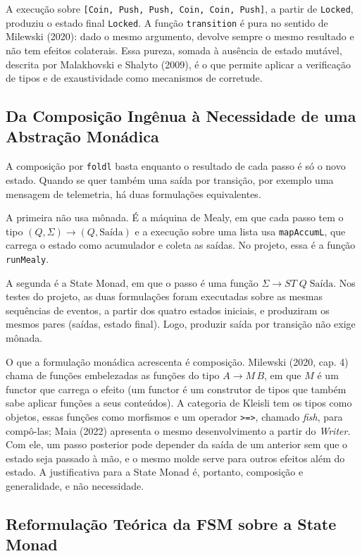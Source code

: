 \documentclass[12pt,a4paper]{article}
\begin{document}
A execução sobre \texttt{[Coin, Push, Push, Coin, Coin, Push]}, a partir de \texttt{Locked}, produziu o estado final \texttt{Locked}. A função \texttt{transition} é pura no sentido de Milewski (2020): dado o mesmo argumento, devolve sempre o mesmo resultado e não tem efeitos colaterais. Essa pureza, somada à ausência de estado mutável, descrita por Malakhovski e Shalyto (2009), é o que permite aplicar a verificação de tipos e de exaustividade como mecanismos de corretude.

\subsection{Da Composição Ingênua à Necessidade de uma Abstração Monádica}

A composição por \texttt{foldl} basta enquanto o resultado de cada passo é só o novo estado. Quando se quer também uma saída por transição, por exemplo uma mensagem de telemetria, há duas formulações equivalentes.

A primeira não usa mônada. É a máquina de Mealy, em que cada passo tem o tipo $(Q, \Sigma) \to (Q, \text{Saída})$ e a execução sobre uma lista usa \texttt{mapAccumL}, que carrega o estado como acumulador e coleta as saídas. No projeto, essa é a função \texttt{runMealy}.

A segunda é a State Monad, em que o passo é uma função $\Sigma \to ST\;Q\;\text{Saída}$. Nos testes do projeto, as duas formulações foram executadas sobre as mesmas sequências de eventos, a partir dos quatro estados iniciais, e produziram os mesmos pares (saídas, estado final). Logo, produzir saída por transição não exige mônada.

O que a formulação monádica acrescenta é composição. Milewski (2020, cap. 4) chama de funções embelezadas as funções do tipo $A \to M\,B$, em que $M$ é um functor que carrega o efeito (um functor é um construtor de tipos que também sabe aplicar funções a seus conteúdos). A categoria de Kleisli tem os tipos como objetos, essas funções como morfismos e um operador \texttt{>=>}, chamado \textit{fish}, para compô-las; Maia (2022) apresenta o mesmo desenvolvimento a partir do \textit{Writer}. Com ele, um passo posterior pode depender da saída de um anterior sem que o estado seja passado à mão, e o mesmo molde serve para outros efeitos além do estado. A justificativa para a State Monad é, portanto, composição e generalidade, e não necessidade.

\subsection{Reformulação Teórica da FSM sobre a State Monad}
\end{document}
